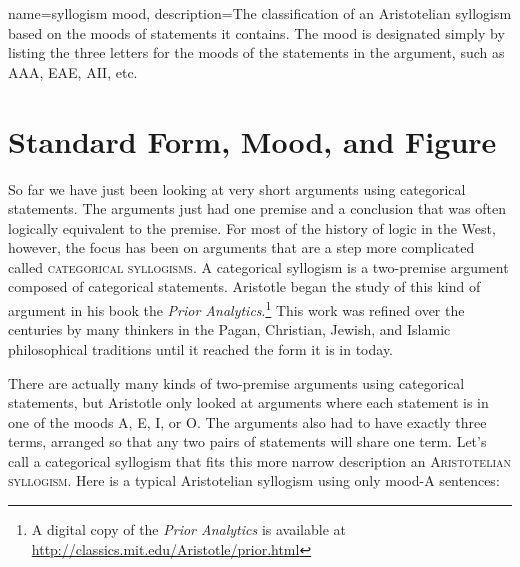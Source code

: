 {
name=syllogism mood,
description={The classification of an Aristotelian syllogism based on the moods of statements it contains. The mood is designated simply by listing the three letters for the moods of the statements in the argument, such as AAA, EAE, AII, etc.}
}


\section{Standard Form, Mood, and Figure}\label{sec:form_mood_figure}

So far we have just been looking at very short arguments using categorical statements. The arguments just had one premise and a conclusion that was often logically equivalent to the premise. For most of the history of logic in the West, however, the focus has been on arguments that are a step more complicated called \textsc{\glspl{categorical syllogism}}. A categorical syllogism is a two-premise argument composed of categorical statements. Aristotle began the study of this kind of argument in his book the \textit{Prior Analytics}.\footnote{A digital copy of the \textit{Prior Analytics} is available at \url{http://classics.mit.edu/Aristotle/prior.html}} This work was refined over the centuries by many thinkers in the Pagan, Christian, Jewish, and Islamic philosophical traditions until it reached the form it is in today.

There are actually many kinds of two-premise arguments using categorical statements, but Aristotle only looked at arguments where each statement is in one of the moods A, E, I, or O. The arguments also had to have exactly three terms, arranged so that any two pairs of statements will share one term. Let's call a categorical syllogism that fits this more narrow description an \textsc{\gls{Aristotelian syllogism}}. Here is a typical Aristotelian syllogism using only mood-A sentences:

\begin{kormanize}
\end{kormanize}
\label{AAA_arg}

